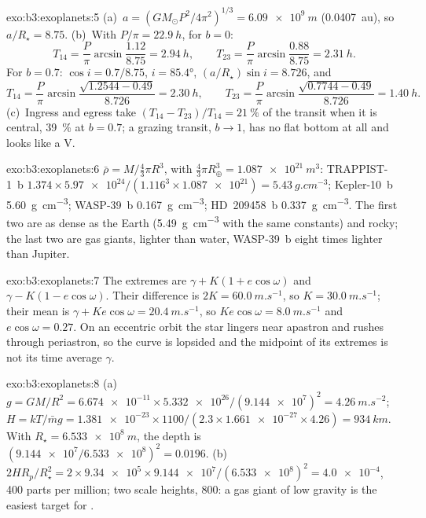 \begin{solution}{exo:b3:exoplanets:5}
(a)~$a = (GM_\odot P^2/4\pi^2)^{1/3} = \qty{6.09e9}{m}$ (\qty{0.0407}{au}),
so $a/R_\star = 8.75$. (b)~With $P/\pi = \qty{22.9}{h}$, for $b = 0$:
\[
T_{14} = \frac P\pi\arcsin\frac{1.12}{8.75} = \qty{2.94}{h}, \qquad
T_{23} = \frac P\pi\arcsin\frac{0.88}{8.75} = \qty{2.31}{h}.
\]
For $b = 0.7$: $\cos i = 0.7/8.75$, $i = \ang{85.4}$, $(a/R_\star)\sin i =
8.726$, and
\[
T_{14} = \frac P\pi\arcsin\frac{\sqrt{1.2544 - 0.49}}{8.726} = \qty{2.30}{h},
\qquad
T_{23} = \frac P\pi\arcsin\frac{\sqrt{0.7744 - 0.49}}{8.726} = \qty{1.40}{h}.
\]
(c)~Ingress and egress take $(T_{14} - T_{23})/T_{14} = \qty{21}{\percent}$
of the transit when it is central, \qty{39}{\percent} at $b = 0.7$; a
grazing transit, $b \to 1$, has no flat bottom at all and looks like a V.
\end{solution}

\begin{solution}{exo:b3:exoplanets:6}
$\bar\rho = M/\tfrac43\pi R^3$, with $\tfrac43\pi R_\oplus^3 =
\qty{1.087e21}{m^3}$: TRAPPIST-1~b $1.374\times\num{5.97e24}/(1.116^3\times
\num{1.087e21}) = \qty{5.43}{g.cm^{-3}}$; Kepler-10~b
\qty{5.60}{g.cm^{-3}}; WASP-39~b \qty{0.167}{g.cm^{-3}}; HD~209458~b
\qty{0.337}{g.cm^{-3}}. The first two are as dense as the Earth
(\qty{5.49}{g.cm^{-3}} with the same constants) and rocky; the last two
are gas giants, lighter than water, WASP-39~b eight times lighter than
Jupiter.
\end{solution}

\begin{solution}{exo:b3:exoplanets:7}
The extremes are $\gamma + K(1 + e\cos\omega)$ and $\gamma - K(1 -
e\cos\omega)$. Their difference is $2K = \qty{60.0}{m.s^{-1}}$, so $K =
\qty{30.0}{m.s^{-1}}$; their mean is $\gamma + Ke\cos\omega =
\qty{20.4}{m.s^{-1}}$, so $Ke\cos\omega = \qty{8.0}{m.s^{-1}}$ and
$e\cos\omega = 0.27$. On an eccentric orbit the star lingers near
apastron and rushes through periastron, so the curve is lopsided and the
midpoint of its extremes is not its time average $\gamma$.
\end{solution}

\begin{solution}{exo:b3:exoplanets:8}
(a)~$g = GM/R^2 = \num{6.674e-11}\times\num{5.332e26}/(\num{9.144e7})^2 =
\qty{4.26}{m.s^{-2}}$; $H = kT/\bar m g = \num{1.381e-23}\times1100/(2.3
\times\num{1.661e-27}\times4.26) = \qty{934}{km}$. With $R_\star =
\qty{6.533e8}{m}$, the depth is $(\num{9.144e7}/\num{6.533e8})^2 =
\num{0.0196}$. (b)~$2HR_p/R_\star^2 = 2\times\num{9.34e5}\times
\num{9.144e7}/(\num{6.533e8})^2 = \num{4.0e-4}$, 400 parts per million;
two scale heights, 800: a gas giant of low gravity is the easiest target
for .
\end{solution}

